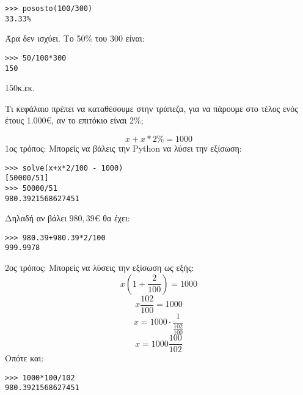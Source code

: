 \begin{lstlisting}
>>> pososto(100/300)
33.33%
\end{lstlisting}
Άρα δεν ισχύει. Το 50\% του 300 είναι:
\begin{lstlisting}
>>> 50/100*300
150
\end{lstlisting}
150κ.εκ.
\begin{exercise}
Τι κεφάλαιο πρέπει να καταθέσουμε στην τράπεζα, για να πάρουμε στο
τέλος ενός έτους 1.000€, αν το επιτόκιο είναι 2\%;
\end{exercise}
$$ x + x*2\% = 1000$$
1ος τρόπος:
Μπορείς να βάλεις την Python να λύσει την εξίσωση:
\begin{lstlisting}
>>> solve(x+x*2/100 - 1000)
[50000/51]
>>> 50000/51
980.3921568627451
\end{lstlisting}
Δηλαδή αν βάλει $980,39$€ θα έχει:
\begin{lstlisting}
>>> 980.39+980.39*2/100
999.9978
\end{lstlisting}
2ος τρόπος:
Μπορείς να λύσεις την εξίσωση ως εξής:
$$ x(1+\frac{2}{100}) = 1000$$
$$x\frac{102}{100}=1000$$
$$x = 1000\cdot\frac{1}{\frac{102}{100}}$$
$$x= 1000\frac{100}{102}$$
Οπότε και:
\begin{lstlisting}
>>> 1000*100/102
980.3921568627451
\end{lstlisting}

